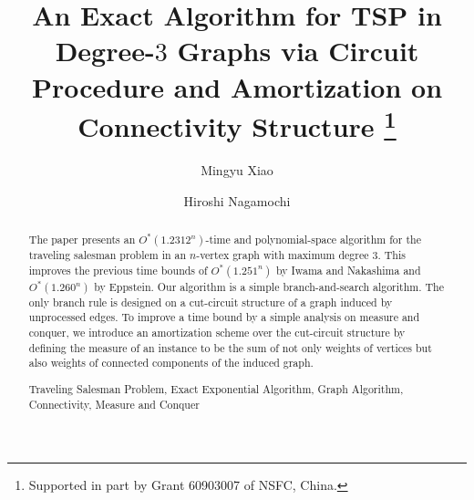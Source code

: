 \documentclass[runningheads]{llncs}
\begin{document}
\title{An Exact Algorithm for TSP in Degree-$3$ Graphs
via Circuit Procedure and Amortization on Connectivity Structure
\thanks{Supported in part by Grant
60903007 of NSFC, China.}
}

\author{Mingyu Xiao \and
Hiroshi Nagamochi}






\authorrunning{}



 \tocauthor{}
\maketitle

\begin{abstract}
The paper presents an $O^*(1.2312^n)$-time and polynomial-space algorithm for the traveling salesman problem
 in an $n$-vertex graph with maximum degree $3$.
This improves the previous time bounds of
$O^*(1.251^n)$ by Iwama and Nakashima and $O^*(1.260^n)$ by Eppstein.
Our algorithm is a simple branch-and-search algorithm.
The only branch rule is designed on a cut-circuit structure of a graph induced by unprocessed edges.
To improve a time bound by a simple analysis on measure and conquer,
we introduce an amortization scheme over the cut-circuit structure
by defining the measure of an instance
to be the sum  of not only weights of vertices but also
weights of connected components of the induced graph.

\vspace{5mm} Traveling Salesman Problem, Exact Exponential Algorithm, Graph Algorithm, Connectivity, Measure and Conquer
\end{abstract}
\end{document}
